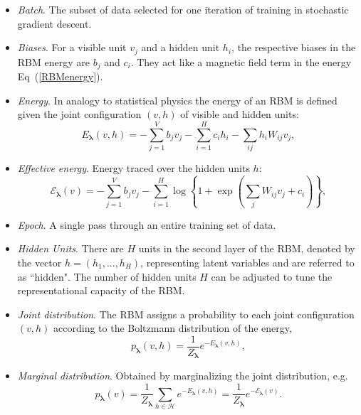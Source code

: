 \documentclass[submission, Phys]{SciPost}
\begin{document}
\begin{itemize}

\item {\it Batch}.  The subset of data selected for one iteration of training in stochastic gradient descent.

\item {\it Biases}.  For a visible unit $v_j$ and a hidden unit $h_i$, the respective biases in the RBM energy are $b_j$ and $c_i$. They act like a magnetic field term in the energy Eq~(\ref{RBMenergy}).

\item {\it Energy}.  In analogy to statistical physics the energy of an RBM is defined given the joint configuration $(v,h)$ of visible and hidden units:
\begin{equation}
E_{\bm{\lambda}}(v,h) = - \sum\limits_{j=1}^V b_j v_j - \sum\limits_{i=1}^H c_i h_i - \sum\limits_{ij} h_i W_{ij} v_j, \label{RBMenergy} 
\end{equation}

\item {\it Effective energy}.  Energy traced over the hidden units $h$:
\begin{equation}
\mathcal{E}_{\bm{\lambda}}(v) = - \sum\limits_{j=1}^V b_j v_j - \sum\limits_{i=1}^H \log \left\{ 1 + \exp \left( \sum\limits_{j} W_{ij}v_j +c_i\right) \right\}, \label{RBMeffectiveenergy} 
\end{equation}

\item {\it Epoch}.  A single pass through an entire training set of data.

\item {\it Hidden Units}.  There are $H$ units in the second layer of the RBM, denoted by the vector $h=(h_1, ..., h_H)$, representing latent variables and are referred to as ``hidden".  The number of hidden units $H$ can be adjusted to tune the representational capacity of the RBM.

\item {\it Joint distribution}.  The RBM assigns a probability to each joint configuration $(v,h)$ according to the Boltzmann distribution of the energy,
\begin{equation}
    p_{\bm{\lambda}}(v,h) = \frac{1}{Z_{\bm{\lambda}}} e^{-E_{\bm{\lambda}}(v,h)},
\end{equation}

\item {\it Marginal distribution}.  Obtained by marginalizing the joint distribution, e.g.
\begin{equation}
\label{Eq:marginal_distribution}
    p_{\bm{\lambda}}(v) = \frac{1}{Z_{\bm{\lambda}}} \sum\limits_{h\in \mathcal{H}} e^{-E_{\bm{\lambda}}(v,h)} = \frac{1}{Z_{\bm{\lambda}}} e^{- \mathcal{E}_{\bm{\lambda}}(v)}.
\end{equation}


\end{itemize}
\end{document}
